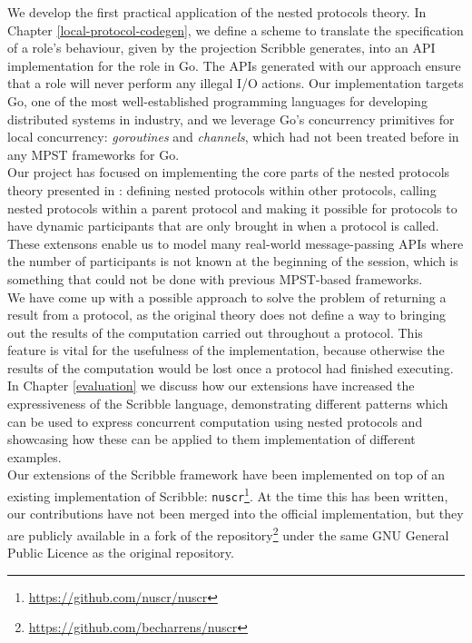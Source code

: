 \documentclass[12pt,twoside]{report}
\begin{document}
We develop the first practical application of the nested protocols theory. In Chapter \ref{local-protocol-codegen}, we define a scheme to translate the specification of a role's behaviour, given by the projection Scribble generates, into an API implementation for the role in Go. The APIs generated with our approach ensure that a role will never perform any illegal I/O actions. Our implementation targets Go, one of the most well-established programming languages for developing distributed systems in industry, and we leverage Go's concurrency primitives for local concurrency: \textit{goroutines} and \textit{channels}, which had not been treated before in any MPST frameworks for Go.\\

Our project has focused on implementing the core parts of the nested protocols theory presented in \cite{nestedprotocols}: defining nested protocols within other protocols, calling nested protocols within a parent protocol and making it possible for protocols to have dynamic participants that are only brought in when a protocol is called. These extensons enable us to model many real-world message-passing APIs where the number of participants is not known at the beginning of the session, which is something that could not be done with previous MPST-based frameworks.\\

We have come up with a possible approach to solve the problem of returning a result from a protocol, as the original theory does not define a way to bringing out the results of the computation carried out throughout a protocol. This feature is vital for the usefulness of the implementation, because otherwise the results of the computation would be lost once a protocol had finished executing.\\

In Chapter \ref{evaluation} we discuss how our extensions have increased the expressiveness of the Scribble language, demonstrating different patterns which can be used to express concurrent computation using nested protocols and showcasing how these can be applied to them implementation of different examples.\\

Our extensions of the Scribble framework have been implemented on top of an existing implementation of Scribble: \texttt{nuscr}\footnote{\href{https://github.com/nuscr/nuscr}{https://github.com/nuscr/nuscr}}. At the time this has been written, our contributions have not been merged into the official implementation, but they are publicly available in a fork of the repository\footnote{\href{https://github.com/becharrens/nuscr}{https://github.com/becharrens/nuscr}} under the same GNU General Public Licence as the original repository.\\
\end{document}
